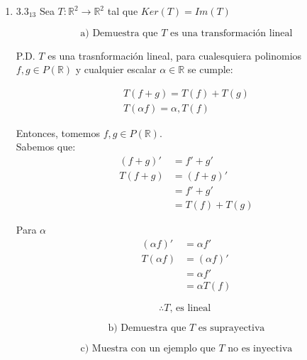 \documentclass{article}
\begin{document}
		\begin{enumerate}
			
			\item[] \(3.3_{13}\) Sea \(T:\mathbb{R}^2\to\mathbb{R}^2\) tal que \(Ker(T)=Im(T)\)
			
			\begin{equation*}
				\text{a) Demuestra que } T \text{ es una transformación lineal}
			\end{equation*}
			
			P.D. \(T\) es una trasnformación lineal, para cualesquiera polinomios \(f,g\in P (\mathbb{R})\) y cualquier escalar \(\alpha \in \mathbb{R}\) se cumple:
			
			\begin{equation*}
				\begin{aligned}
					T(f+g) = T(f) + T(g) \\
					T(\alpha f) = \alpha, T(f)
				\end{aligned}
			\end{equation*}
			
			Entonces, tomemos \(f,g\in P(\mathbb{R})\). \\
			Sabemos que: 
			\begin{equation*}
				\begin{aligned}
					(f+g)' &=f'+g' \\
					T(f+g) &= (f+g)' \\
						   &= f'+g' \\
					&=T(f)+T(g)
				\end{aligned}
			\end{equation*}
			
			Para $\alpha$ \\
			\begin{equation*}
				\begin{aligned}
					(\alpha f)' &=\alpha f' \\
					T(\alpha f) &=(\alpha f)' \\
								&=\alpha f' \\
								&=\alpha T(f)
				\end{aligned}
			\end{equation*}
			
			\[
			\boxed{\therefore T \text{, es lineal }}
			\]
			
			\begin{equation*}
				\text{b) Demuestra que } T \text{ es suprayectiva}
			\end{equation*}
			
			\begin{equation*}
				\text{c) Muestra con un ejemplo que } T \text{ no es inyectiva}
			\end{equation*}
			

\end{enumerate}
\end{document}
